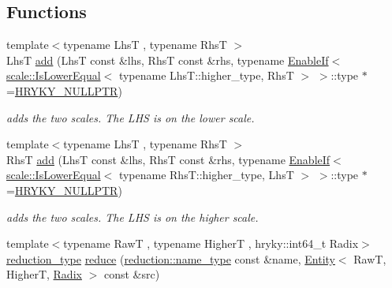 \subsection*{Functions}
\begin{DoxyCompactItemize}
\item 
\hypertarget{namespacehryky_1_1scale_ac2fe4df99c737fa954907b456a705f75}{{\footnotesize template$<$typename Lhs\-T , typename Rhs\-T $>$ }\\Lhs\-T \hyperlink{namespacehryky_1_1scale_ac2fe4df99c737fa954907b456a705f75}{add} (Lhs\-T const \&lhs, Rhs\-T const \&rhs, typename \hyperlink{classhryky_1_1_enable_if}{Enable\-If}$<$ \hyperlink{classhryky_1_1scale_1_1_is_lower_equal}{scale\-::\-Is\-Lower\-Equal}$<$ typename Lhs\-T\-::higher\-\_\-type, Rhs\-T $>$ $>$\-::type $\ast$=\hyperlink{common_8h_a4cd4ac09cfcdbd6b30ee69afc156e210}{H\-R\-Y\-K\-Y\-\_\-\-N\-U\-L\-L\-P\-T\-R})}\label{namespacehryky_1_1scale_ac2fe4df99c737fa954907b456a705f75}

\begin{DoxyCompactList}\small\item\em adds the two scales. The L\-H\-S is on the lower scale. \end{DoxyCompactList}\item 
\hypertarget{namespacehryky_1_1scale_ad9e9b8df1f0e41c8de221227e2ea1a8f}{{\footnotesize template$<$typename Lhs\-T , typename Rhs\-T $>$ }\\Rhs\-T \hyperlink{namespacehryky_1_1scale_ad9e9b8df1f0e41c8de221227e2ea1a8f}{add} (Lhs\-T const \&lhs, Rhs\-T const \&rhs, typename \hyperlink{classhryky_1_1_enable_if}{Enable\-If}$<$ \hyperlink{classhryky_1_1scale_1_1_is_lower_equal}{scale\-::\-Is\-Lower\-Equal}$<$ typename Rhs\-T\-::higher\-\_\-type, Lhs\-T $>$ $>$\-::type $\ast$=\hyperlink{common_8h_a4cd4ac09cfcdbd6b30ee69afc156e210}{H\-R\-Y\-K\-Y\-\_\-\-N\-U\-L\-L\-P\-T\-R})}\label{namespacehryky_1_1scale_ad9e9b8df1f0e41c8de221227e2ea1a8f}

\begin{DoxyCompactList}\small\item\em adds the two scales. The L\-H\-S is on the higher scale. \end{DoxyCompactList}\item 
\hypertarget{namespacehryky_1_1scale_a6bbb1a80e433741768d3590c888ff644}{{\footnotesize template$<$typename Raw\-T , typename Higher\-T , hryky\-::int64\-\_\-t Radix$>$ }\\\hyperlink{namespacehryky_a343a9a4c36a586be5c2693156200eadc}{reduction\-\_\-type} \hyperlink{namespacehryky_1_1scale_a6bbb1a80e433741768d3590c888ff644}{reduce} (\hyperlink{namespacehryky_1_1reduction_ac686c30a4c8d196bbd0f05629a6b921f}{reduction\-::name\-\_\-type} const \&name, \hyperlink{classhryky_1_1scale_1_1_entity}{Entity}$<$ Raw\-T, Higher\-T, \hyperlink{classhryky_1_1scale_1_1_radix}{Radix} $>$ const \&src)}\label{namespacehryky_1_1scale_a6bbb1a80e433741768d3590c888ff644}


\end{DoxyCompactItemize}
